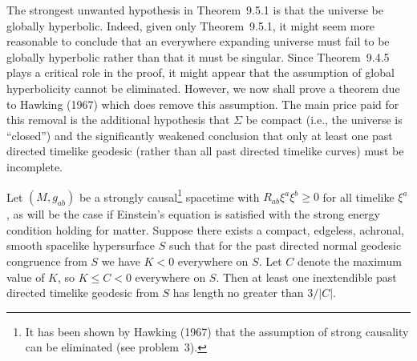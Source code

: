 The strongest unwanted hypothesis in Theorem~9.5.1 is that the universe be globally
hyperbolic. Indeed, given only Theorem~9.5.1, it might seem more reasonable to
conclude that an everywhere expanding universe must fail to be globally hyperbolic
rather than that it must be singular. Since Theorem~9.4.5 plays a critical role in the
proof, it might appear that the assumption of global hyperbolicity cannot be
eliminated. However, we now shall prove a theorem due to Hawking (1967) which does
remove this assumption. The main price paid for this removal is the additional
hypothesis that \(\Sigma\) be compact (i.e., the universe is ``closed'') and the
significantly weakened conclusion that only at least one past directed timelike
geodesic (rather than all past directed timelike curves) must be incomplete.

\begin{theorem}\label{thm:9.5.2}
Let \((M,g_{ab})\) be a strongly causal\footnote{It has been shown by Hawking
(1967) that the assumption of strong causality can be eliminated (see problem~3).}
spacetime with \(R_{ab}\xi^a\xi^b\geq0\) for all timelike \(\xi^a\), as will be the
case if Einstein's equation is satisfied with the strong energy condition holding for
matter. Suppose there exists a compact, edgeless, achronal, smooth spacelike
hypersurface \(S\) such that for the past directed normal geodesic congruence from
\(S\) we have \(K<0\) everywhere on \(S\). Let \(C\) denote the maximum value of
\(K\), so \(K\leq C<0\) everywhere on \(S\). Then at least one inextendible past
directed timelike geodesic from \(S\) has length no greater than \(3/\lvert C\rvert\).
\end{theorem}

